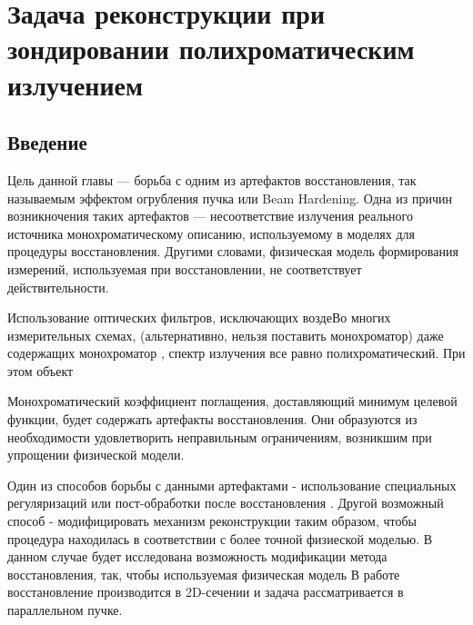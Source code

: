 \chapter{Задача реконструкции при зондировании полихроматическим излучением} \label{chapt3}
\section{Введение}

Цель данной главы --- борьба с одним из артефактов восстановления, так называемым эффектом огрубления пучка или Beam Hardening. 
Одна из причин возникночения таких артефактов --- несоответствие излучения реального источника монохроматическому описанию, используемому в моделях для процедуры восстановления.
Другими словами, физическая модель формирования измерений, используемая при восстановлении, не соответствует действительности.

Использование оптических фильтров, исключающих воздеВо многих измерительных схемах, (альтернативно, нельзя поставить монохроматор) даже содержащих монохроматор \cite{chukalina2014xray}, спектр излучения все равно полихроматический. 
При этом объект

Монохроматический коэффициент поглащения, доставляющий минимум целевой функции, будет содержать артефакты восстановления.
Они образуются из необходимости удовлетворить неправильным ограничениям, возникшим при упрощении физической модели.

Один из способов борьбы с данными артефактами - использование специальных регуляризаций или пост-обработки после восстановления \cite{van2011iterative}.
Другой возможный способ - модифицировать механизм реконструкции таким образом, чтобы процедура находилась в соответствии с более точной физиеской моделью.
В данном случае будет исследована возможность модификации метода восстановления, так, чтобы используемая физическая модель 
В работе восстановление производится в 2D-сечении и задача рассматривается в параллельном пучке.


